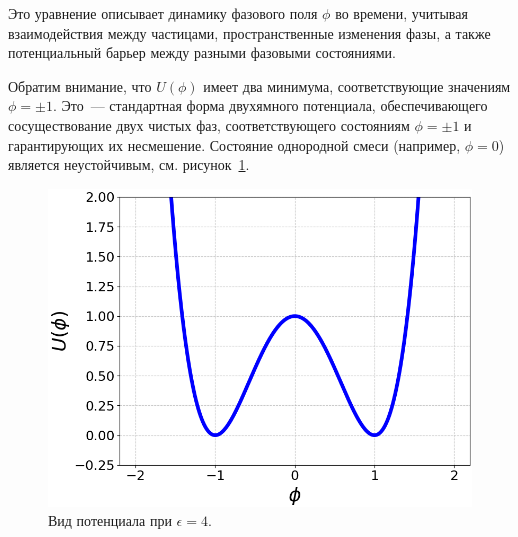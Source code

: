 Это уравнение описывает динамику фазового поля $\phi$ во времени, учитывая взаимодействия между частицами, пространственные изменения фазы, а также потенциальный барьер между разными фазовыми состояниями.

Обратим внимание, что $U(\phi)$ имеет два минимума, соответствующие
значениям \mbox{$\phi=\pm1$}. Это~--- стандартная форма двухямного потенциала, обеспечивающего сосуществование двух чистых фаз, соответствующего состояниям $\phi=\pm1$ и гарантирующих их несмешение. Состояние однородной смеси (например, $\phi = 0$) является неустойчивым, см. рисунок~\ref{fig:potential}.

\begin{figure}[t!]
    \centering
    \includegraphics[width=0.6\linewidth]{images/potential.png}
    \caption{Вид потенциала при $\epsilon = 4$.}
    \label{fig:potential}
\end{figure}

